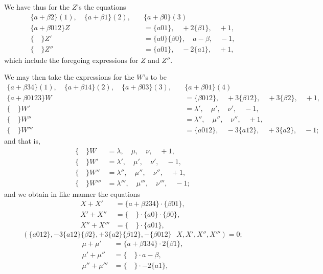 \documentclass[11pt,a4paper]{book}
\begin{document}
We have thus for the $Z$'s the equations
\begin{align*}
\{a + \beta 2\}(1), \quad \{a + \beta 1\}(2), \quad &\{a + \beta 0\}(3) \\
\{a + \beta 012\}Z &= \{a01\}, \quad +2\{\beta 1\}, \quad +1, \\
\{ \quad \}Z' &= \{a0\}\{\beta 0\}, \quad a - \beta, \quad -1, \\
\{ \quad \}Z'' &= \{a01\}, \quad -2\{a1\}, \quad +1,
\end{align*}
which include the foregoing expressions for $Z$ and $Z''$.

We may then take the expressions for the $W$'s to be
\begin{align*}
\{a + \beta 34\}(1), \quad \{a + \beta 14\}(2), \quad \{a + \beta 03\}(3), \quad &\{a + \beta 01\}(4) \\
\{a + \beta 0123\}W &= \{\beta 012\}, \quad +3\{\beta 12\}, \quad +3\{\beta 2\}, \quad +1, \\
\{ \quad \}W' &= \lambda', \quad \mu', \quad \nu', \quad -1, \\
\{ \quad \}W'' &= \lambda'', \quad \mu'', \quad \nu'', \quad +1, \\
\{ \quad \}W''' &= \{a012\}, \quad -3\{a12\}, \quad +3\{a2\}, \quad -1;
\end{align*}
and that is,
\begin{align*}
\{ \quad \}W &= \lambda, \quad \mu, \quad \nu, \quad +1, \\
\{ \quad \}W' &= \lambda', \quad \mu', \quad \nu', \quad -1, \\
\{ \quad \}W'' &= \lambda'', \quad \mu'', \quad \nu'', \quad +1, \\
\{ \quad \}W''' &= \lambda''', \quad \mu''', \quad \nu''', \quad -1;
\end{align*}
and we obtain in like manner the equations
\begin{align*}
X + X' &= \{a + \beta 234\} \cdot \{\beta 01\}, \\
X' + X'' &= \{ \quad \} \cdot \{a0\} \cdot \{\beta 0\}, \\
X'' + X''' &= \{ \quad \} \cdot \{a01\},
\end{align*}
\[
(\{a012\}, -3\{a12\}\{\beta2\}, +3\{a2\}\{\beta12\}, -\{\beta012\} \,\,\,\, X, X', X'', X''') = 0;
\]
\begin{align*}
\mu + \mu' &= \{a + \beta 134\} \cdot 2\{\beta 1\}, \\
\mu' + \mu'' &= \{ \quad \} \cdot a - \beta, \\
\mu'' + \mu''' &= \{ \quad \} \cdot -2\{a1\},
\end{align*}
\end{document}
